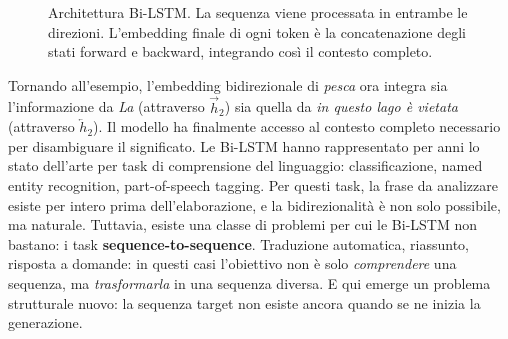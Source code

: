 \begin{figure}[htbp]
\caption{Architettura Bi-LSTM. La sequenza viene processata in entrambe le direzioni. L'embedding finale di ogni token è la concatenazione degli stati forward e backward, integrando così il contesto completo.}
\label{fig:bilstm}
\end{figure}
Tornando all'esempio, l'embedding bidirezionale di \textit{pesca} ora integra sia l'informazione da \textit{La} (attraverso $\overrightarrow{h}_2$) sia quella da \textit{in questo lago è vietata} (attraverso $\overleftarrow{h}_2$). Il modello ha finalmente accesso al contesto completo necessario per disambiguare il significato.
Le Bi-LSTM hanno rappresentato per anni lo stato dell'arte per task di comprensione del linguaggio: classificazione, named entity recognition, part-of-speech tagging. Per questi task, la frase da analizzare esiste per intero prima dell'elaborazione, e la bidirezionalità è non solo possibile, ma naturale.
Tuttavia, esiste una classe di problemi per cui le Bi-LSTM non bastano: i task \textbf{sequence-to-sequence}. Traduzione automatica, riassunto, risposta a domande: in questi casi l'obiettivo non è solo \textit{comprendere} una sequenza, ma \textit{trasformarla} in una sequenza diversa. E qui emerge un problema strutturale nuovo: la sequenza target non esiste ancora quando se ne inizia la generazione.





